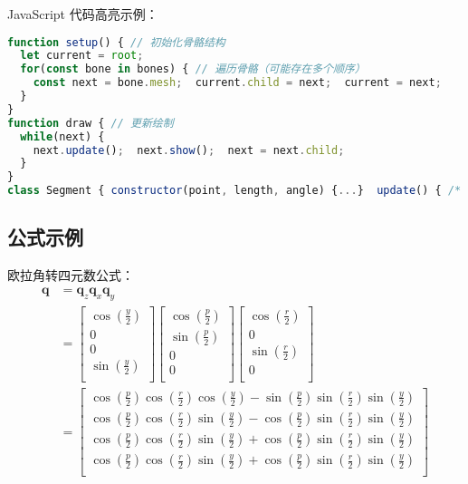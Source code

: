 JavaScript 代码高亮示例：

\begin{lstlisting}[language=JavaScript]
function setup() { // 初始化骨骼结构
  let current = root;
  for(const bone in bones) { // 遍历骨骼（可能存在多个顺序）
    const next = bone.mesh;  current.child = next;  current = next;
  }
}
function draw { // 更新绘制
  while(next) {
    next.update();  next.show();  next = next.child;
  }
}
class Segment { constructor(point, length, angle) {...}  update() { /* 根据父节点更新位置 */ } }
\end{lstlisting}


\subsection{公式示例}

欧拉角转四元数公式：
\begin{equation}
  \begin{aligned}
  \mathbf{q} &= \mathbf{q}_z \mathbf{q}_x \mathbf{q}_y \\
  &={
      \begin{bmatrix}
        \cos(\frac{y}{2})\\0\\0\\\sin(\frac{y}{2})\\
      \end{bmatrix}
    }{
      \begin{bmatrix}
        \cos(\frac{p}{2})\\\sin(\frac{p}{2})\\0\\0\\
      \end{bmatrix}
    }{
      \begin{bmatrix}
        \cos(\frac{r}{2})\\0\\\sin(\frac{r}{2})\\0\\
      \end{bmatrix}
    }\\
  &={
    \begin{bmatrix}
      \cos(\frac{p}{2})\cos(\frac{r}{2})\cos(\frac{y}{2})-\sin(\frac{p}{2})\sin(\frac{r}{2})\sin(\frac{y}{2})\\
      \cos(\frac{p}{2})\cos(\frac{r}{2})\sin(\frac{y}{2})-\cos(\frac{p}{2})\sin(\frac{r}{2})\sin(\frac{y}{2})\\
      \cos(\frac{p}{2})\cos(\frac{r}{2})\sin(\frac{y}{2})+\cos(\frac{p}{2})\sin(\frac{r}{2})\sin(\frac{y}{2})\\
      \cos(\frac{p}{2})\cos(\frac{r}{2})\sin(\frac{y}{2})+\cos(\frac{p}{2})\sin(\frac{r}{2})\sin(\frac{y}{2})\\
    \end{bmatrix}}\\
  \end{aligned}
\end{equation}

